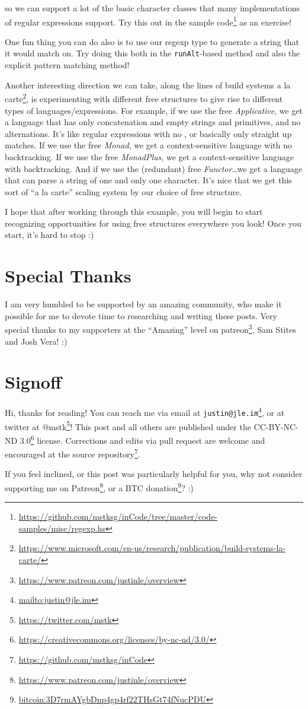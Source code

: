 \documentclass[]{article}
\renewcommand{\href}[2]{#2\footnote{\url{#1}}}
\begin{document}
so we can support a lot of the basic character classes that many implementations
of regular expressions support. Try this out in the
\href{https://github.com/mstksg/inCode/tree/master/code-samples/misc/regexp.hs}{sample
code} as an exercise!

One fun thing you can do also is to use our regexp type to generate a string
that it would match on. Try doing this both in the \texttt{runAlt}-based method
and also the explicit pattern matching method!

Another interesting direction we can take, along the lines of
\href{https://www.microsoft.com/en-us/research/publication/build-systems-la-carte/}{build
systems a la carte}, is experimenting with different free structures to give
rise to different types of languages/expressions. For example, if we use the
free \emph{Applicative}, we get a language that has only concatenation and empty
strings and primitives, and no alternations. It's like regular expressions with
no \texttt{\textbar{}}, or basically only straight up matches. If we use the
free \emph{Monad}, we get a context-sensitive language with no backtracking. If
we use the free \emph{MonadPlus}, we get a context-sensitive language with
backtracking. And if we use the (redundant) free \emph{Functor}\ldots we get a
language that can parse a string of one and only one character. It's nice that
we get this sort of ``a la carte'' scaling system by our choice of free
structure.

I hope that after working through this example, you will begin to start
recognizing opportunities for using free structures everywhere you look! Once
you start, it's hard to stop :)

\section{Special Thanks}\label{special-thanks}

I am very humbled to be supported by an amazing community, who make it possible
for me to devote time to researching and writing these posts. Very special
thanks to my supporters at the ``Amazing'' level on
\href{https://www.patreon.com/justinle/overview}{patreon}, Sam Stites and Josh
Vera! :)

\section{Signoff}\label{signoff}

Hi, thanks for reading! You can reach me via email at
\href{mailto:justin@jle.im}{\nolinkurl{justin@jle.im}}, or at twitter at
\href{https://twitter.com/mstk}{@mstk}! This post and all others are published
under the \href{https://creativecommons.org/licenses/by-nc-nd/3.0/}{CC-BY-NC-ND
3.0} license. Corrections and edits via pull request are welcome and encouraged
at \href{https://github.com/mstksg/inCode}{the source repository}.

If you feel inclined, or this post was particularly helpful for you, why not
consider \href{https://www.patreon.com/justinle/overview}{supporting me on
Patreon}, or a \href{bitcoin:3D7rmAYgbDnp4gp4rf22THsGt74fNucPDU}{BTC donation}?
:)
\end{document}
